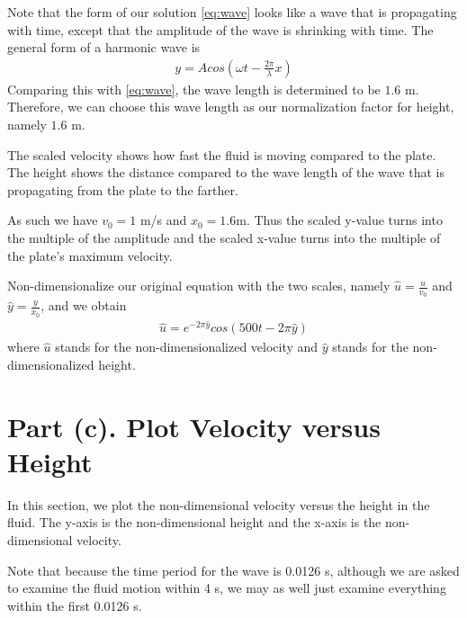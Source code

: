 \documentclass{article}
\begin{document}
Note that the form of our solution \ref{eq:wave} looks like a wave that is propagating with time, except that the amplitude of the wave is shrinking with time. The general form of a harmonic wave is
\begin{align}
y = A cos(\omega t - \frac{2\pi}{\lambda}x)\label{eq:generalWave}
\end{align}
Comparing this with \ref{eq:wave}, the wave length is determined to be $1.6$ m. Therefore, we can choose this wave length as our normalization factor for height, namely $1.6$ m.

The scaled velocity shows how fast the fluid is moving compared to the plate. The height shows the distance compared to the wave length of the wave that is propagating from the plate to the farther.

As such we have $v_0 = 1$ m/s and $x_0 = 1.6 $m. Thus the scaled y-value turns into the multiple of the amplitude and the scaled x-value turns into the multiple of the plate's maximum velocity.

Non-dimensionalize our original equation with the two scales, namely $\hat{u} = \frac{u}{v_0}$ and $\hat{y} = \frac{y}{x_0}$,
and we obtain
\begin{align}
\hat{u} = e^{-2\pi \hat{y}}cos(500t-2\pi\hat{y})
\end{align}
where $\hat{u}$ stands for the non-dimensionalized velocity and $\hat{y}$ stands for the non-dimensionalized height.

\section{Part (c). Plot Velocity versus Height}
In this section, we plot the non-dimensional velocity versus the height in the fluid. The y-axis is the non-dimensional height and the x-axis is the non-dimensional velocity.

Note that because the time period for the wave is 0.0126 s, although we are asked to examine the fluid motion within 4 s, we may as well just examine everything within the first 0.0126 s.
\end{document}
